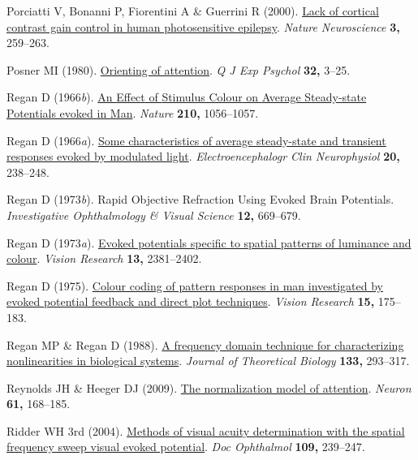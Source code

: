 \documentclass[
  letterpaper,
  DIV=11,
  numbers=noendperiod]{scrartcl}
\newlength{\cslhangindent}
\newenvironment{CSLReferences}[2] %
 {\begin{list}{}{%
  \setlength{\itemindent}{0pt}
  \setlength{\leftmargin}{0pt}
  \setlength{\parsep}{0pt}
  \ifodd #1
   \setlength{\leftmargin}{\cslhangindent}
   \setlength{\itemindent}{-1\cslhangindent}
  \fi
  \setlength{\itemsep}{#2\baselineskip}}}
 {\end{list}}
\begin{document}
\begin{CSLReferences}{1}{1}
Porciatti V, Bonanni P, Fiorentini A \& Guerrini R (2000).
\href{https://doi.org/10.1038/72972}{Lack of cortical contrast gain
control in human photosensitive epilepsy}. \emph{Nature Neuroscience}
\textbf{3,} 259--263.

Posner MI (1980).
\href{https://doi.org/10.1080/00335558008248231}{Orienting of
attention}. \emph{Q J Exp Psychol} \textbf{32,} 3--25.

Regan D (1966\emph{b}). \href{https://doi.org/10.1038/2101056a0}{An
{Effect} of {Stimulus Colour} on {Average Steady-state Potentials}
evoked in {Man}}. \emph{Nature} \textbf{210,} 1056--1057.

Regan D (1966\emph{a}).
\href{https://doi.org/10.1016/0013-4694(66)90088-5}{Some characteristics
of average steady-state and transient responses evoked by modulated
light}. \emph{Electroencephalogr Clin Neurophysiol} \textbf{20,}
238--248.

Regan D (1973\emph{b}). Rapid {Objective Refraction Using Evoked Brain
Potentials}. \emph{Investigative Ophthalmology \& Visual Science}
\textbf{12,} 669--679.

Regan D (1973\emph{a}).
\href{https://doi.org/10.1016/0042-6989(73)90237-X}{Evoked potentials
specific to spatial patterns of luminance and colour}. \emph{Vision
Research} \textbf{13,} 2381--2402.

Regan D (1975).
\href{https://doi.org/10.1016/0042-6989(75)90205-9}{Colour coding of
pattern responses in man investigated by evoked potential feedback and
direct plot techniques}. \emph{Vision Research} \textbf{15,} 175--183.

Regan MP \& Regan D (1988).
\href{https://doi.org/10.1016/S0022-5193(88)80323-0}{A frequency domain
technique for characterizing nonlinearities in biological systems}.
\emph{Journal of Theoretical Biology} \textbf{133,} 293--317.

Reynolds JH \& Heeger DJ (2009).
\href{https://doi.org/10.1016/j.neuron.2009.01.002}{The normalization
model of attention}. \emph{Neuron} \textbf{61,} 168--185.

Ridder WH 3rd (2004).
\href{https://doi.org/10.1007/s10633-004-8053-7}{Methods of visual
acuity determination with the spatial frequency sweep visual evoked
potential}. \emph{Doc Ophthalmol} \textbf{109,} 239--247.


\end{CSLReferences}
\end{document}
